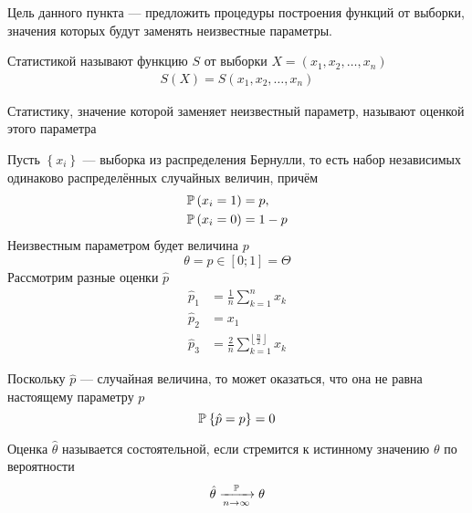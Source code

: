 Цель данного пункта --- предложить процедуры построения функций от выборки,
значения которых будут заменять неизвестные параметры.

\begin{definition}[Статистика]
  \label{def:statistic}
  Статистикой называют функцию $S$ от выборки
  $X= \left(x_1,x_2,\dots,x_n\right)$
  \begin{align*}
    S\left(X\right) = S\left(x_1, x_2, \dots, x_n\right)
  \end{align*}
\end{definition}
\begin{definition}[Оценка]Статистику,
  значение которой заменяет неизвестный параметр,
  называют оценкой этого параметра
\end{definition}
\begin{example}\label{example:bernulliEstimator}
  Пусть $\left\{ x_i \right\}$ --- выборка из распределения Бернулли,
  то есть набор независимых одинаково распределённых случайных величин, причём
  \begin{equation*}
    \begin{split}
      \mathbb{P}\left( x_i = 1 \right) &= p,\\
      \mathbb{P}\left( x_i=0 \right)   &= 1-p
    \end{split}
  \end{equation*}
  Неизвестным параметром будет величина $p$
  \begin{equation*}
    \theta = p \in \left[ 0; 1 \right] = \Theta
  \end{equation*}
  Рассмотрим разные оценки $\hat{p}$
  \begin{align*}
    \hat{p}_1&= \frac{1}{n}\sum_{k=1}^n x_k\\
    \hat{p}_2&=x_1\\
    \hat{p}_3&=
      \frac{2}{n}\sum_{k=1}^{\left\lfloor \frac{n}{2} \right\rfloor} x_k
  \end{align*}
\end{example}

\begin{remark}
Поскольку $\hat{p}$ --- случайная величина, то может оказаться,
что она не равна настоящему параметру $p$
$$\mathbb{P}_{{}}\left\{ \hat{p}=p \right\}=0$$
\end{remark}

\begin{definition}
  Оценка $\hat{\theta}$ называется состоятельной,
  если стремится к истинному значению $\theta$ по вероятности
  $$\hat{\theta}\xrightarrow[n\to\infty]{\mathbb{P}}\theta$$
\end{definition}

